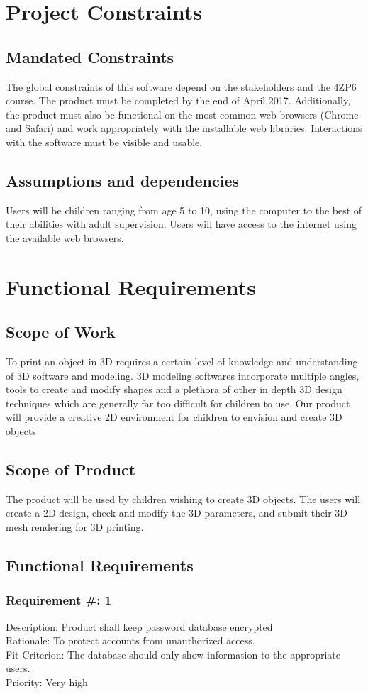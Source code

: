 \documentclass{report}
\begin{document}
\chapter{Project Constraints}
\section{Mandated Constraints}
The global constraints of this software depend on the stakeholders and the 4ZP6 course.  The product must be completed by the end of April 2017.  Additionally, the product must also be functional on the most common web browsers (Chrome and Safari) and work appropriately with the installable web libraries. Interactions with the software must be visible and usable. 
\section{Assumptions and dependencies}
Users will be children ranging from age 5 to 10, using the computer to the best of their abilities with adult supervision.  Users will have access to the internet using the available web browsers.

\chapter{Functional Requirements}
\section{Scope of Work}
To print an object in 3D requires a certain level of knowledge and understanding of 3D software and modeling. 3D modeling softwares incorporate multiple angles, tools to create and modify shapes and a plethora of other in depth 3D design techniques which are generally far too difficult for children to use.  Our product will provide a creative 2D environment for children to envision and create 3D objects
\section{Scope of Product}
The product will be used by children wishing to create 3D objects.  The users will create a 2D design, check and modify the 3D parameters, and submit their 3D mesh rendering for 3D printing.
\section{Functional Requirements}
\subsection{Requirement \#: 1}
Description: Product shall keep password database encrypted
\\Rationale: To protect accounts from unauthorized access.
\\Fit Criterion: The database should only show information to the appropriate users.
\\Priority: Very high
\end{document}
